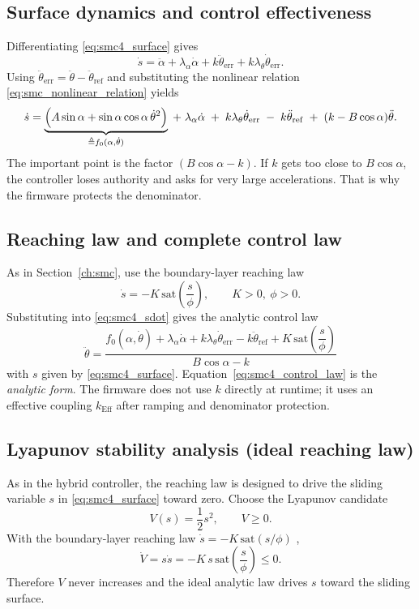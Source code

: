 \subsection{Surface dynamics and control effectiveness}
Differentiating \eqref{eq:smc4_surface} gives
\begin{equation}
\dot{s} = \ddot{\alpha} + \lambda_{\alpha}\dot{\alpha}
        + k\ddot{\theta}_{\mathrm{err}} + k\lambda_{\theta}\dot{\theta}_{\mathrm{err}}.
\label{eq:smc4_sdot_start}
\end{equation}
Using $\ddot{\theta}_{\mathrm{err}}=\ddot{\theta}-\ddot{\theta}_{\mathrm{ref}}$ and substituting the nonlinear relation \eqref{eq:smc_nonlinear_relation} yields
\begin{equation}
\dot{s}
=
\underbrace{\Bigl(A\sin\alpha+\sin\alpha\cos\alpha\,\dot{\theta}^2\Bigr)}_{\triangleq f_0(\alpha,\dot{\theta})}
\;+\;
\lambda_{\alpha}\dot{\alpha}
\;+\;
k\lambda_{\theta}\dot{\theta}_{\mathrm{err}}
\;-\;
k\ddot{\theta}_{\mathrm{ref}}
\;+\;
(k-B\cos\alpha)\ddot{\theta}.
\label{eq:smc4_sdot}
\end{equation}
The important point is the factor $(B\cos\alpha-k)$. If $k$ gets too close to $B\cos\alpha$, the controller loses authority and asks for very large accelerations. That is why the firmware protects the denominator.

\subsection{Reaching law and complete control law}
As in Section~\ref{ch:smc}, use the boundary-layer reaching law
\[
\dot{s} = -K\,\mathrm{sat}\!\left(\frac{s}{\phi}\right),\qquad K>0,\ \phi>0.
\]
Substituting into \eqref{eq:smc4_sdot} gives the analytic control law
\begin{equation}
\boxed{
\ddot{\theta}
  =
  \frac{
    f_0(\alpha,\dot{\theta})
    + \lambda_{\alpha}\dot{\alpha}
    + k\lambda_{\theta}\dot{\theta}_{\mathrm{err}}
    - k\ddot{\theta}_{\mathrm{ref}}
    + K\,\mathrm{sat}\!\left(\dfrac{s}{\phi}\right)
  }{
    B\cos\alpha - k
  }
}
\label{eq:smc4_control_law}
\end{equation}
with $s$ given by \eqref{eq:smc4_surface}. Equation~\eqref{eq:smc4_control_law} is the \emph{analytic form}. The firmware does not use $k$ directly at runtime; it uses an effective coupling $k_{\mathrm{Eff}}$ after ramping and denominator protection.

\subsection{Lyapunov stability analysis (ideal reaching law)}
As in the hybrid controller, the reaching law is designed to drive the sliding variable $s$ in \eqref{eq:smc4_surface} toward zero. Choose the Lyapunov candidate
\[
V(s)=\frac{1}{2}s^2,\qquad V\ge 0.
\]
With the boundary-layer reaching law $\dot{s}=-K\,\mathrm{sat}(s/\phi)$ \cite{utkin1992,slotine1991,Young1999},
\[
\dot{V}=s\dot{s}=-K\,s\,\mathrm{sat}\!\left(\frac{s}{\phi}\right)\le 0.
\]
Therefore $V$ never increases and the ideal analytic law drives $s$ toward the sliding surface.

